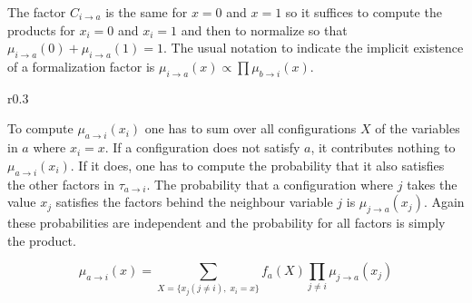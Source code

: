 The factor $C_{i \rightarrow a}$ is the same for $x=0$ and $x=1$ so it suffices to compute the products for $x_i = 0$ and $x_i = 1$ and then to normalize so that $\mu_{i\rightarrow a}(0) + \mu_{i \rightarrow a}(1) = 1$. The usual notation to indicate the implicit existence of a formalization factor is $\mu_{i \rightarrow a}(x) \propto \prod \mu_{b \rightarrow i}(x)$. \cite{lecture} 


\begin{wrapfigure}{r}{0.3\textwidth}

\end{wrapfigure}

To compute $\mu_{a \rightarrow i}(x_i)$ one has to sum over all configurations $X$ of the variables in $a$ where $x_i = x$. If a configuration does not satisfy $a$, it contributes nothing to $\mu_{a \rightarrow i}(x_i)$. If it does, one has to compute the probability that it also satisfies the other factors in $\tau_{a \rightarrow i}$. The probability that a configuration where $j$ takes the value $x_j$ satisfies the factors behind the neighbour variable $j$ is $\mu_{j \rightarrow a}(x_j)$. Again these probabilities are independent and the probability for all factors is simply the product.

$$\mu_{a \rightarrow i}(x) = \sum_{ X = \{x_j (j \neq i), \; x_i = x\}} f_a(X) \prod_{j \neq i} \mu_{j \rightarrow a}(x_j)$$


